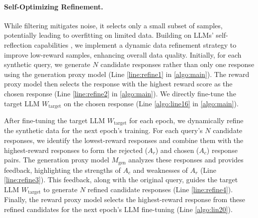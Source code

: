 \paragraph{Self-Optimizing Refinement.}

While filtering mitigates noise, it selects only a small subset of samples, potentially leading to overfitting on limited data.
Building on LLMs' self-reflection capabilities \citep{aman2023self}, we implement a dynamic data refinement strategy to improve low-reward samples, enhancing overall data quality.
Initially, for each synthetic query, we generate $N$ candidate responses rather than only one response using the generation proxy model (Line \ref{line:refine1} in \cref{algo:main}). 
The reward proxy model then selects the response with the highest reward score as the chosen response (Line \ref{line:refine2} in \cref{algo:main}). 
We directly fine-tune the target LLM $W_\text{target}$ on the chosen response (Line \ref{algo:line16} in \cref{algo:main}).

After fine-tuning the target LLM $W_\text{target}$ for each epoch, we dynamically refine the synthetic data for the next epoch’s training. 
For each query’s $N$ candidate responses, we identify the lowest-reward responses and combine them with the highest-reward responses to form the rejected ($A_r$) and chosen ($A_c$) response pairs. 
The generation proxy model $M_{\text{gen}}$ analyzes these responses and provides feedback, highlighting the strengths of $A_c$ and weaknesses of $A_r$ (Line \ref{line:refine3}). 
This feedback, along with the original query, guides the target LLM $W_{\text{target}}$ to generate $N$ refined candidate responses (Line \ref{line:refine4}). 
Finally, the reward proxy model selects the highest-reward response from these refined candidates for the next epoch’s LLM fine-tuning (Line \ref{algo:lin20}).

